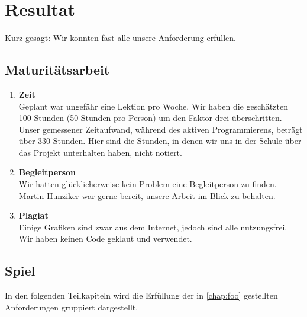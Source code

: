 \chapter{Resultat}
Kurz gesagt: Wir konnten fast alle unsere Anforderung erfüllen.

\section{Maturitätsarbeit}
\begin{enumerate}
    \item \textbf{Zeit} \\
        Geplant war ungefähr eine Lektion pro Woche. Wir haben die geschätzten 100 Stunden (50 Stunden pro Person) um den Faktor drei überschritten. Unser gemessener Zeitaufwand, während des aktiven Programmierens,
        beträgt über 330 Stunden. Hier sind die Stunden, in denen wir uns in der Schule über das Projekt unterhalten haben, nicht notiert.
    \item \textbf{Begleitperson} \\
        Wir hatten glücklicherweise kein Problem eine Begleitperson zu finden. Martin Hunziker war gerne bereit, unsere Arbeit im Blick zu behalten.
    \item \textbf{Plagiat} \\
        Einige Grafiken sind zwar aus dem Internet, jedoch sind alle nutzungsfrei. Wir haben keinen Code geklaut und verwendet. 
\end{enumerate}

\section{Spiel}
In den folgenden Teilkapiteln wird die Erfüllung der in \autoref{chap:foo} gestellten Anforderungen gruppiert dargestellt. 
